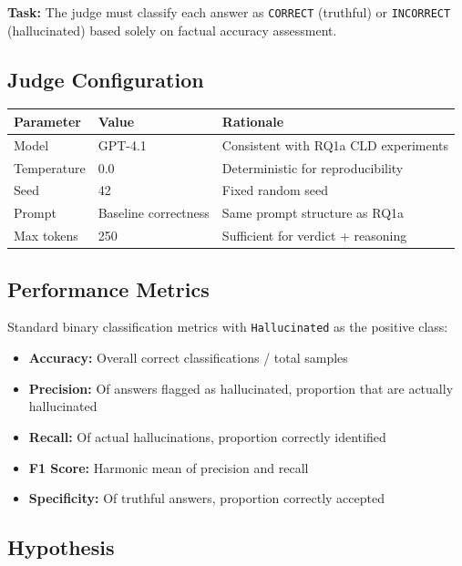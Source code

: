 \textbf{Task:} The judge must classify each answer as \texttt{CORRECT} (truthful) or \texttt{INCORRECT} (hallucinated) based solely on factual accuracy assessment.

\subsection{Judge Configuration}

\begin{table}[H]
\centering
\footnotesize
\begin{tabular}{@{}l l l@{}}
\toprule
\textbf{Parameter} & \textbf{Value} & \textbf{Rationale} \\
\midrule
Model & GPT-4.1 & Consistent with RQ1a CLD experiments \\
Temperature & 0.0 & Deterministic for reproducibility \\
Seed & 42 & Fixed random seed \\
Prompt & Baseline correctness & Same prompt structure as RQ1a \\
Max tokens & 250 & Sufficient for verdict + reasoning \\
\bottomrule
\end{tabular}
\end{table}

\subsection{Performance Metrics}

Standard binary classification metrics with \texttt{Hallucinated} as the positive class:
\begin{itemize}[noitemsep]
    \item \textbf{Accuracy:} Overall correct classifications / total samples
    \item \textbf{Precision:} Of answers flagged as hallucinated, proportion that are actually hallucinated
    \item \textbf{Recall:} Of actual hallucinations, proportion correctly identified
    \item \textbf{F1 Score:} Harmonic mean of precision and recall
    \item \textbf{Specificity:} Of truthful answers, proportion correctly accepted
\end{itemize}

\subsection{Hypothesis}

